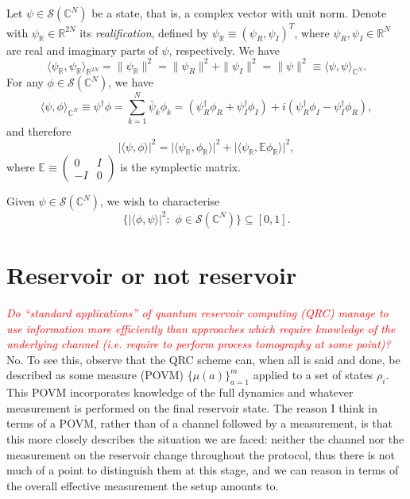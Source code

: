 \documentclass[12pt]{report}
\newcommand{\CC}{\mathbb{C}}
\newcommand{\EE}{\mathbb{E}}
\newcommand{\RR}{\mathbb{R}}
\newcommand{\calS}{{\mathcal{S}}}
\begin{document}
Let $\psi\in\calS(\CC^N)$ be a state, that is, a complex vector with unit norm.
Denote with $\psi_\RR\in\RR^{2N}$ its \emph{realification}, defined by
$\psi_\RR\equiv(\psi_R,\psi_I)^T$, where $\psi_R,\psi_I\in\RR^N$ are real and imaginary parts of $\psi$, respectively. We have
\begin{equation}
	\langle \psi_\RR,\psi_\RR\rangle_{\RR^{2N}}
	= \|\psi_\RR\|^2 = \|\psi_R\|^2 + \|\psi_I\|^2
	= \|\psi\|^2 \equiv \langle \psi,\psi\rangle_{\CC^N}.
\end{equation}
For any $\phi\in\calS(\CC^N)$, we have
\begin{equation}
	\langle \psi,\phi\rangle_{\CC^N}
	\equiv \psi^\dagger \phi
	= \sum_{k=1}^N \bar\psi_k \phi_k
	= (\psi_R^\dagger\phi_R + \psi_I^\dagger \phi_I)
	+ i(\psi_R^\dagger \phi_I - \psi_I^\dagger\phi_R),
\end{equation}
and therefore
\begin{equation}
	\lvert\langle \psi,\phi\rangle\rvert^2
	= \lvert \langle \psi_\RR,\phi_\RR\rangle \rvert^2
	+ \lvert \langle \psi_\RR,\EE\phi_\RR\rangle \rvert^2,
\end{equation}
where $\EE\equiv \begin{pmatrix}0 & I \\ -I & 0\end{pmatrix}$ is the symplectic matrix.

Given $\psi\in\calS(\CC^N)$, we wish to characterise
\begin{equation}
	\{ \lvert\langle \phi,\psi\rangle\rvert^2 : \,\,\phi\in\calS(\CC^N) \}
	\subseteq [0,1].
\end{equation}

\section{Reservoir or not reservoir}

\textcolor{red}{\emph{Do ``standard applications'' of quantum reservoir computing (QRC) manage to use information more efficiently than approaches which require knowledge of the underlying channel (\emph{i.e.} require to perform process tomography at some point)?}}
No. To see this, observe that the QRC scheme can, when all is said and done, be described as some measure (POVM) $\{\mu(a)\}_{a=1}^m$ applied to a set of states $\rho_i$. This POVM incorporates knowledge of the full dynamics and whatever measurement is performed on the final reservoir state.
The reason I think in terms of a POVM, rather than of a channel followed by a measurement, is that this more closely describes the situation we are faced: neither the channel nor the measurement on the reservoir change throughout the protocol, thus there is not much of a point to distinguish them at this stage, and we can reason in terms of the overall effective measurement the setup amounts to.
\end{document}
